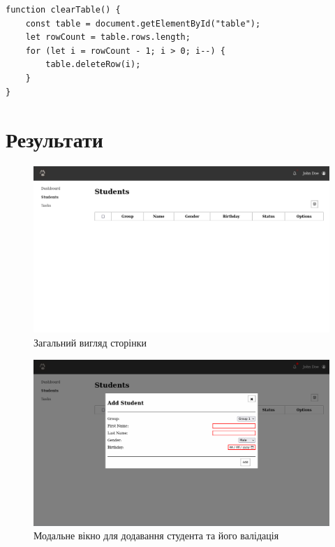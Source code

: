 \documentclass{article}
\begin{document}
\begin{normalsize}
\begin{lstlisting}
function clearTable() {
	const table = document.getElementById("table");
	let rowCount = table.rows.length;
	for (let i = rowCount - 1; i > 0; i--) {
		table.deleteRow(i);
	}
}

\end{lstlisting}

\section*{Результати}
\begin{figure}[H]
	\centering
	\includegraphics[scale=0.35]{1}
	\caption{Загальний вигляд сторінки}
\end{figure}

\begin{figure}[H]
	\centering
	\includegraphics[scale=0.35]{3}
	\caption{Модальне вікно для додавання студента та його валідація}
\end{figure}


\end{normalsize}
\end{document}
